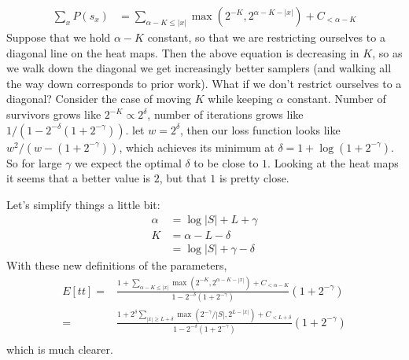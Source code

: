 \documentclass{article}
\begin{document}
\begin{align}
\sum_x P(s_x) & = \sum_{\alpha - K\leq |x|}\max (2^{-K},2^{\alpha -K - |x|}) + C_{ < \alpha - K}
\end{align}
Suppose that we hold $\alpha - K$ constant, so that we are restricting ourselves to a diagonal line on the heat maps.
Then the above equation is decreasing in $K$, so as we walk down  the diagonal we get increasingly better samplers (and walking all the way down corresponds to prior work).
What if we don't restrict ourselves to a diagonal?
Consider the case of moving $K$ while keeping $\alpha$ constant.
Number of survivors grows like $2^{-K}\propto 2^\delta$,
number of iterations grows like $1/(1 - 2^{ - \delta}(1 + 2^{ - \gamma}))$.
let $w = 2^\delta$, then our loss function looks like $w^2/(w - (1 + 2^{ - \gamma}))$,
which achieves its minimum at $\delta = 1 +\log (1 + 2^{ - \gamma})$.
So for large $\gamma$ we expect the optimal $\delta$ to be close to $1$.
Looking at the heat maps it seems that a better value is $2$, but that $1$ is pretty close.


Let's simplify things a little bit:
\begin{align}
  \alpha& = \log |S| +L + \gamma\\
  K &= \alpha - L - \delta\\
  & = \log |S| + \gamma - \delta
\end{align}
With these new definitions of the parameters,
\begin{align}
  E[tt] =& \frac{1 + \sum_{\alpha - K\leq |x|}\max (2^{-K},2^{\alpha -K - |x|}) + C_{ < \alpha - K}}{1 - 2^{ - \delta}(1 + 2^{ - \gamma})}(1 + 2^{ - \gamma})\\
   =& \frac{1 + 2^\delta\sum_{|x|\geq L + \delta}\max (2^{ - \gamma}/|S|,2^{L  - |x|}) + C_{ < L + \delta}}{1 - 2^{ - \delta}(1 + 2^{ - \gamma})}(1 + 2^{ - \gamma})\\
\end{align}
which is much clearer.
\end{document}
